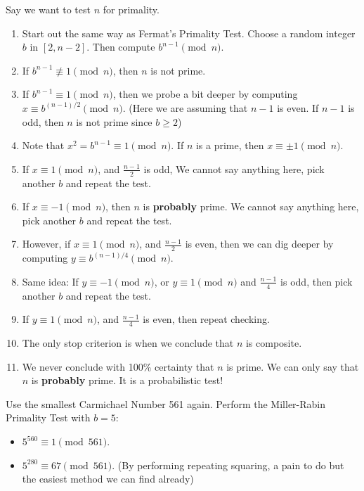 \documentclass[letterpaper,12pt,oneside]{article}
\begin{document}
Say we want to test $n$ for primality. \begin{enumerate}
    \item Start out the same way as Fermat's Primality Test. Choose a random integer $b$ in $[2,n-2]$. Then compute $b^{n-1}\pmod n$.
    \item If $b^{n-1}\not\equiv 1 \pmod n$, then $n$ is not prime.
    \item If $b^{n-1}\equiv 1 \pmod n$, then we probe a bit deeper by computing $x\equiv b^{(n-1)/2}\pmod n$. (Here we are assuming that $n-1$ is even. If $n-1$ is odd, then $n$ is not prime since $b\ge 2$)
    \item Note that $x^2=b^{n-1}\equiv 1 \pmod n$. If $n$ is a prime, then $x\equiv \pm 1 \pmod n$. 
    \item If $x\equiv 1 \pmod n$, and $\frac{n-1}{2}$ is odd, We cannot say anything here, pick another $b$ and repeat the test.
    \item If $x\equiv -1 \pmod n$, then $n$ is \textbf{probably} prime. We cannot say anything here, pick another $b$ and repeat the test.
    \item However, if $x\equiv 1 \pmod n$, and $\frac{n-1}{2}$ is even, then we can dig deeper by computing $y\equiv b^{(n-1)/4}\pmod n$.
    \item Same idea: If $y\equiv - 1 \pmod n$, or $y\equiv 1 \pmod n$ and $\frac{n-1}{4}$ is odd, then pick another $b$ and repeat the test.
    \item If $y\equiv 1 \pmod n$, and $\frac{n-1}{4}$ is even, then repeat checking. 
    \item The only stop criterion is when we conclude that $n$ is composite.
    \item We never conclude with 100\% certainty that $n$ is prime. We can only say that $n$ is \textbf{probably} prime. It is a probabilistic test!
\end{enumerate}
Use the smallest Carmichael Number 561 again. Perform the Miller-Rabin Primality Test with $b=5$: \begin{itemize}
    \item $5^{560}\equiv 1 \pmod {561}$.
    \item $5^{280}\equiv 67 \pmod {561}$. (By performing repeating squaring, a pain to do but the easiest method we can find already)
\end{itemize}
\end{document}
